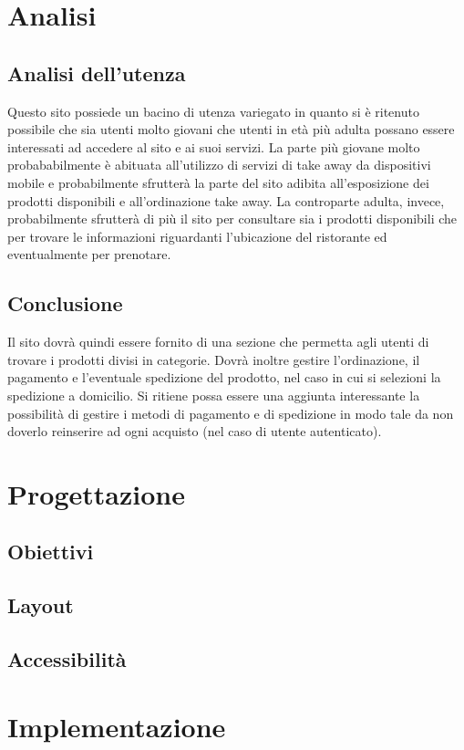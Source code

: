 \documentclass{article}
\begin{document}
	\section{Analisi}
		\subsection{Analisi dell'utenza}
			Questo sito possiede un bacino di utenza variegato in quanto si è ritenuto possibile che sia utenti molto giovani che utenti in età più adulta possano essere interessati ad accedere al sito e ai suoi servizi.
			La parte più giovane molto probababilmente è abituata all'utilizzo di servizi di take away da dispositivi mobile e probabilmente sfrutterà la parte del sito adibita all'esposizione dei prodotti disponibili e all'ordinazione take away.
			La controparte adulta, invece, probabilmente sfrutterà di più il sito per consultare sia i prodotti disponibili che per trovare le informazioni riguardanti l'ubicazione del ristorante ed eventualmente per prenotare. 
		\subsection{Conclusione}
			Il sito dovrà quindi essere fornito di una sezione che permetta agli utenti di trovare i prodotti divisi in categorie. Dovrà inoltre gestire l'ordinazione, il pagamento e l'eventuale spedizione del prodotto, nel caso in cui si selezioni la spedizione a domicilio.
			Si ritiene possa essere una aggiunta interessante la possibilità di gestire i metodi di pagamento e di spedizione in modo tale da non doverlo reinserire ad ogni acquisto (nel caso di utente autenticato).	
	\section{Progettazione}
		\subsection{Obiettivi}
		\subsection{Layout}
		\subsection{Accessibilità}
	\section{Implementazione}
\end{document}
